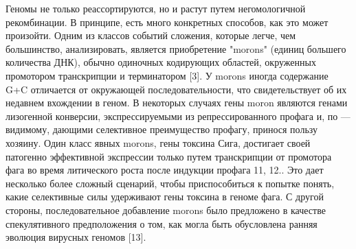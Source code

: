 \documentclass[a4paper,12pt]{article}
\begin{document}
    \par{Геномы не только реассортируются, но и растут путем негомологичной рекомбинации. В принципе, есть много
    конкретных способов, как это может произойти. Одним из классов событий сложения, которые легче, чем большинство,
    анализировать, является приобретение "morons" (единиц большего количества ДНК), обычно одиночных кодирующих
    областей, окруженных промотором транскрипции и терминатором [3]. У morons иногда содержание G+C отличается от
    окружающей последовательности, что свидетельствует об их недавнем вхождении в геном. В некоторых случаях гены moron
    являются генами лизогенной конверсии, экспрессируемыми из репрессированного профага и, по — видимому, дающими
    селективное преимущество профагу, принося пользу хозяину. Один класс явных morons, гены токсина Сига, достигает
    своей патогенно эффективной экспрессии только путем транскрипции от промотора фага во время литического роста после
    индукции профага 11, 12.. Это дает несколько более сложный сценарий, чтобы приспособиться к попытке понять, какие
    селективные силы удерживают гены токсина в геноме фага. С другой стороны, последовательное добавление morons было
    предложено в качестве спекулятивного предположения о том, как могла быть обусловлена ранняя эволюция вирусных
    геномов [13].}
    
\end{document}
